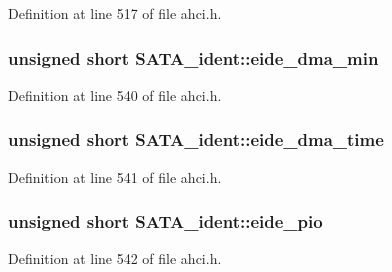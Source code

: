 Definition at line 517 of file ahci.\+h.

\subsubsection[{\texorpdfstring{eide\+\_\+dma\+\_\+min}{eide_dma_min}}]{\setlength{\rightskip}{0pt plus 5cm}unsigned short S\+A\+T\+A\+\_\+ident\+::eide\+\_\+dma\+\_\+min}\hypertarget{structSATA__ident_a298cef7737e82b93d37c519b06fe3d37}{}\label{structSATA__ident_a298cef7737e82b93d37c519b06fe3d37}


Definition at line 540 of file ahci.\+h.

\subsubsection[{\texorpdfstring{eide\+\_\+dma\+\_\+time}{eide_dma_time}}]{\setlength{\rightskip}{0pt plus 5cm}unsigned short S\+A\+T\+A\+\_\+ident\+::eide\+\_\+dma\+\_\+time}\hypertarget{structSATA__ident_a63768c1ba04a1ca34944e34cbf4239fa}{}\label{structSATA__ident_a63768c1ba04a1ca34944e34cbf4239fa}


Definition at line 541 of file ahci.\+h.

\subsubsection[{\texorpdfstring{eide\+\_\+pio}{eide_pio}}]{\setlength{\rightskip}{0pt plus 5cm}unsigned short S\+A\+T\+A\+\_\+ident\+::eide\+\_\+pio}\hypertarget{structSATA__ident_a4a56a283b3953bbf7319c35b6ef38654}{}\label{structSATA__ident_a4a56a283b3953bbf7319c35b6ef38654}


Definition at line 542 of file ahci.\+h.


